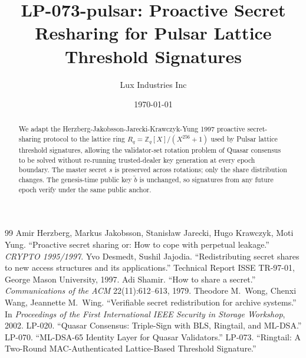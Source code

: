 \documentclass[11pt,a4paper]{article}
\title{LP-073-pulsar: Proactive Secret Resharing for Pulsar Lattice Threshold Signatures}
\author{Lux Industries Inc}
\date{\today}
\begin{document}
\maketitle

\begin{abstract}
We adapt the Herzberg-Jakobsson-Jarecki-Krawczyk-Yung 1997 proactive
secret-sharing protocol to the lattice ring $R_q = \mathbb{Z}_q[X]/(X^{256}+1)$
used by Pulsar lattice threshold signatures, allowing the validator-set
rotation problem of Quasar consensus to be solved without re-running
trusted-dealer key generation at every epoch boundary. The master secret
$s$ is preserved across rotations; only the share distribution changes.
The genesis-time public key $\tilde b$ is unchanged, so signatures from
any future epoch verify under the same public anchor.
\end{abstract}



\begin{thebibliography}{99}
Amir Herzberg, Markus Jakobsson, Stanis\l{}aw Jarecki, Hugo Krawczyk, Moti Yung.
``Proactive secret sharing or: How to cope with perpetual leakage.''
\emph{CRYPTO 1995/1997}.
Yvo Desmedt, Sushil Jajodia.
``Redistributing secret shares to new access structures and its applications.''
Technical Report ISSE TR-97-01, George Mason University, 1997.
Adi Shamir.
``How to share a secret.''
\emph{Communications of the ACM} 22(11):612--613, 1979.
Theodore M.\ Wong, Chenxi Wang, Jeannette M.\ Wing.
``Verifiable secret redistribution for archive systems.''
In \emph{Proceedings of the First International IEEE Security in Storage Workshop}, 2002.
LP-020. ``Quasar Consensus: Triple-Sign with BLS, Ringtail, and ML-DSA.''
LP-070. ``ML-DSA-65 Identity Layer for Quasar Validators.''
LP-073. ``Ringtail: A Two-Round MAC-Authenticated Lattice-Based Threshold Signature.''
\end{thebibliography}
\end{document}
